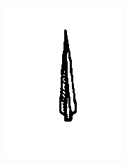 \documentclass[12pt,english]{article}
\begin{document}
\begin{figure}[!hbt]
\begin{centre}
\begin{minipage}{0.32\textwidth}
		\includegraphics[width=\textwidth]{../code/contour/binarised/subulate}
	\end{minipage}
\end{centre}
\end{figure}
\end{document}
